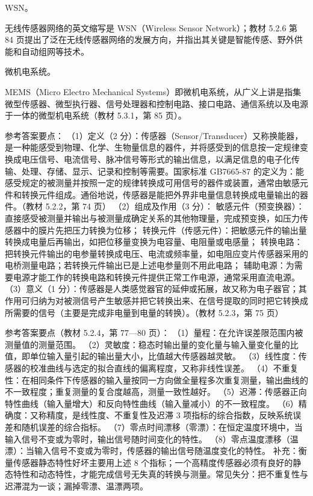 \documentclass[a4paper,11pt]{article}
\begin{document}
\q WSN。\begin{analysis}无线传感器网络的英文缩写是 WSN（Wireless Sensor Network）；教材 5.2.6 第 84 页提出了泛在无线传感器网络的发展方向，并指出其关键是智能传感、野外供能和自动组网等技术。\end{analysis}

\q 微机电系统。\begin{analysis}MEMS（Micro Electro Mechanical Systems）即微机电系统，从广义上讲是指集微型传感器、微型执行器、信号处理器和控制电路、接口电路、通信系统以及电源于一体的微型机电系统（教材 5.3.1，第 85 页）。\end{analysis}


\q 参考答案要点：
（1）定义（2 分）：传感器（Sensor/Transducer）又称换能器，是一种能感受到物理、化学、生物量信息的器件，并将感受到的信息按一定规律变换成电压信号、电流信号、脉冲信号等形式的输出信息，以满足信息的电子化传输、处理、存储、显示、记录和控制等需要。国家标准 GB7665-87 的定义为：能感受规定的被测量并按照一定的规律转换成可用信号的器件或装置，通常由敏感元件和转换元件组成。通俗地说，传感器是能把外界非电量信息转换成电量输出的器件。（教材 5.2.2，第 74 页）
（2）组成及作用（3 分）：
敏感元件（预变换器）：直接感受被测量并输出与被测量成确定关系的其他物理量，完成预变换，如压力传感器中的膜片先把压力转换为位移；
转换元件（传感元件）：把敏感元件的输出量转换成电量后再输出，如把位移量变换为电容量、电阻量或电感量；
转换电路：把转换元件输出的电参量转换成电压、电流或频率量，如电阻应变片传感器采用的电桥测量电路；若转换元件输出已是上述电参量则不用此电路；
辅助电源：为需要电源才能工作的转换电路和转换元件提供正常工作电源，通常采用直流电源。
（3）意义（1 分）：传感器是人类感觉器官的延伸或拓展，故又称为电子器官；其作用可归纳为对被测信号产生敏感并把它转换出来、在信号提取的同时把它转换成所需要的信号（主要是完成非电量到电量的转换）。（教材 5.2.3，第 75 页）

\q 参考答案要点（教材 5.2.4，第 77—80 页）：
（1）量程：在允许误差限范围内被测量值的测量范围。
（2）灵敏度：稳态时输出量的变化量与输入量变化量的比值，即单位输入量引起的输出量大小，比值越大传感器越灵敏。
（3）线性度：传感器的校准曲线与选定的拟合直线的偏离程度，又称非线性误差。
（4）不重复性：在相同条件下传感器的输入量按同一方向做全量程多次重复测量，输出曲线的不一致程度；重复测量的复合度越高，测量一致性越好。
（5）迟滞：传感器正向特性曲线（输入量增大）和反向特性曲线（输入量减小）的不一致程度。
（6）精确度：又称精度，是线性度、不重复性及迟滞 3 项指标的综合指数，反映系统误差和随机误差的综合指标。
（7）零点时间漂移（零漂）：在恒定温度环境中，当输入信号不变或为零时，输出信号随时间变化的特性。
（8）零点温度漂移（温漂）：当输入信号不变或为零时，传感器的输出信号随温度变化的特性。
补充：衡量传感器静态特性好坏主要用上述 8 个指标；一个高精度传感器必须有良好的静态特性和动态特性，才能完成信号无失真的转换与测量。常见失分：把不重复性与迟滞混为一谈；漏掉零漂、温漂两项。
\end{document}
